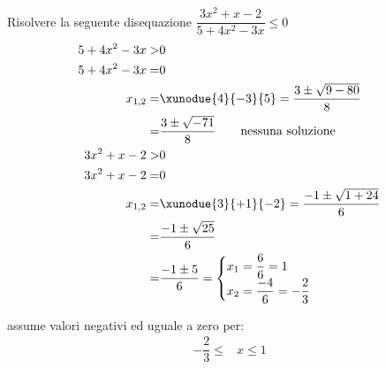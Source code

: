 	Risolvere la seguente disequazione $\dfrac{3x^2+x-2}{5+4x^2-3x}\leq 0$
	\begin{align*}
	5+4x^2-3x>&0\\
5+4x^2-3x=&0\\
x_{1,2}=&\xunodue{4}{-3}{5}=\dfrac{3\pm\sqrt{9-80}}{8}\\
=&\dfrac{3\pm\sqrt{-71}}{8}
\qquad\text{nessuna soluzione}\\
3x^2+x-2>&0\\
3x^2+x-2=&0\\
x_{1,2}=&\xunodue{3}{+1}{-2}=\dfrac{-1\pm\sqrt{1+24}}{6}\\
=&\dfrac{-1\pm\sqrt{25}}{6}\\
=&\dfrac{-1\pm 5}{6}=\begin{cases}
x_1=\dfrac{6}{6}=1\\
x_2=\dfrac{-4}{6}=-\dfrac{2}{3}
\end{cases}\\
	\end{align*}
	\begin{center}
		
	\end{center}
assume valori negativi ed uguale a zero per:
\begin{align*}
-\dfrac{2}{3}\leq&x\leq 1\\
\end{align*}
